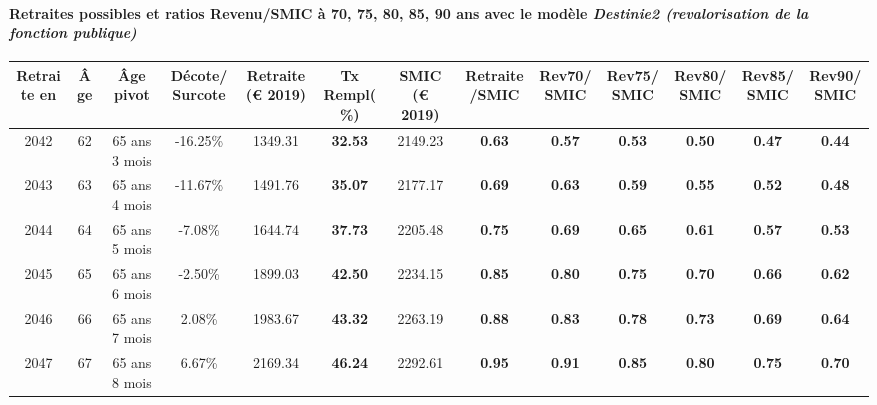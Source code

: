 \paragraph{Retraites possibles et ratios Revenu/SMIC à 70, 75, 80, 85, 90 ans avec le modèle \emph{Destinie2 (revalorisation de la fonction publique)}}  
 
{ \scriptsize \begin{center} 
\begin{tabular}[htb]{|c|c||c|c||c|c||c||c|c|c|c|c|c|} 
\hline 
 Retraite en &  Âge &  Âge pivot &  Décote/Surcote &  Retraite (\euro{} 2019) &  Tx Rempl(\%) &  SMIC (\euro{} 2019) &  Retraite/SMIC &  Rev70/SMIC &  Rev75/SMIC &  Rev80/SMIC &  Rev85/SMIC &  Rev90/SMIC \\ 
\hline \hline 
 2042 &  62 &  65 ans 3 mois &  -16.25\% &  1349.31 &  {\bf 32.53} &  2149.23 &  {\bf {\color{red} 0.63}} &  {\bf {\color{red} 0.57}} &  {\bf {\color{red} 0.53}} &  {\bf {\color{red} 0.50}} &  {\bf {\color{red} 0.47}} &  {\bf {\color{red} 0.44}} \\ 
\hline 
 2043 &  63 &  65 ans 4 mois &  -11.67\% &  1491.76 &  {\bf 35.07} &  2177.17 &  {\bf {\color{red} 0.69}} &  {\bf {\color{red} 0.63}} &  {\bf {\color{red} 0.59}} &  {\bf {\color{red} 0.55}} &  {\bf {\color{red} 0.52}} &  {\bf {\color{red} 0.48}} \\ 
\hline 
 2044 &  64 &  65 ans 5 mois &  -7.08\% &  1644.74 &  {\bf 37.73} &  2205.48 &  {\bf {\color{red} 0.75}} &  {\bf {\color{red} 0.69}} &  {\bf {\color{red} 0.65}} &  {\bf {\color{red} 0.61}} &  {\bf {\color{red} 0.57}} &  {\bf {\color{red} 0.53}} \\ 
\hline 
 2045 &  65 &  65 ans 6 mois &  -2.50\% &  1899.03 &  {\bf 42.50} &  2234.15 &  {\bf {\color{red} 0.85}} &  {\bf {\color{red} 0.80}} &  {\bf {\color{red} 0.75}} &  {\bf {\color{red} 0.70}} &  {\bf {\color{red} 0.66}} &  {\bf {\color{red} 0.62}} \\ 
\hline 
 2046 &  66 &  65 ans 7 mois &  2.08\% &  1983.67 &  {\bf 43.32} &  2263.19 &  {\bf {\color{red} 0.88}} &  {\bf {\color{red} 0.83}} &  {\bf {\color{red} 0.78}} &  {\bf {\color{red} 0.73}} &  {\bf {\color{red} 0.69}} &  {\bf {\color{red} 0.64}} \\ 
\hline 
 2047 &  67 &  65 ans 8 mois &  6.67\% &  2169.34 &  {\bf 46.24} &  2292.61 &  {\bf {\color{red} 0.95}} &  {\bf {\color{red} 0.91}} &  {\bf {\color{red} 0.85}} &  {\bf {\color{red} 0.80}} &  {\bf {\color{red} 0.75}} &  {\bf {\color{red} 0.70}} \\ 
\hline 
\hline 
\end{tabular} 
\end{center} } 

